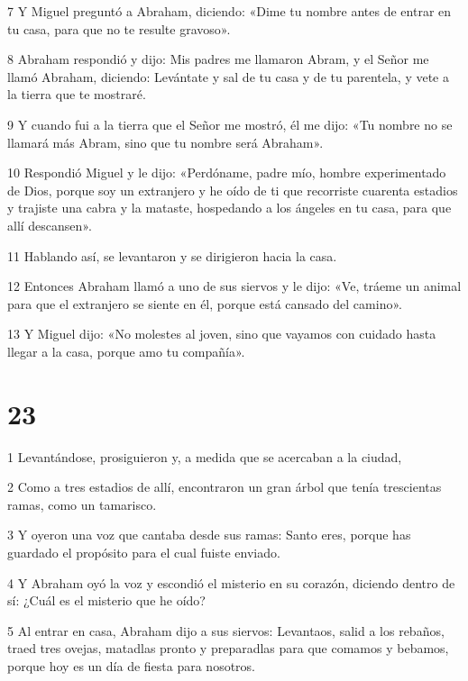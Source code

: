 \par 7 Y Miguel preguntó a Abraham, diciendo: «Dime tu nombre antes de entrar en tu casa, para que no te resulte gravoso».

\par 8 Abraham respondió y dijo: Mis padres me llamaron Abram, y el Señor me llamó Abraham, diciendo: Levántate y sal de tu casa y de tu parentela, y vete a la tierra que te mostraré.

\par 9 Y cuando fui a la tierra que el Señor me mostró, él me dijo: «Tu nombre no se llamará más Abram, sino que tu nombre será Abraham».

\par 10 Respondió Miguel y le dijo: «Perdóname, padre mío, hombre experimentado de Dios, porque soy un extranjero y he oído de ti que recorriste cuarenta estadios y trajiste una cabra y la mataste, hospedando a los ángeles en tu casa, para que allí descansen».

\par 11 Hablando así, se levantaron y se dirigieron hacia la casa.

\par 12 Entonces Abraham llamó a uno de sus siervos y le dijo: «Ve, tráeme un animal para que el extranjero se siente en él, porque está cansado del camino».

\par 13 Y Miguel dijo: «No molestes al joven, sino que vayamos con cuidado hasta llegar a la casa, porque amo tu compañía».

\chapter{23}

\par 1 Levantándose, prosiguieron y, a medida que se acercaban a la ciudad,

\par 2 Como a tres estadios de allí, encontraron un gran árbol que tenía trescientas ramas, como un tamarisco.

\par 3 Y oyeron una voz que cantaba desde sus ramas: Santo eres, porque has guardado el propósito para el cual fuiste enviado.

\par 4 Y Abraham oyó la voz y escondió el misterio en su corazón, diciendo dentro de sí: ¿Cuál es el misterio que he oído?

\par 5 Al entrar en casa, Abraham dijo a sus siervos: Levantaos, salid a los rebaños, traed tres ovejas, matadlas pronto y preparadlas para que comamos y bebamos, porque hoy es un día de fiesta para nosotros.

